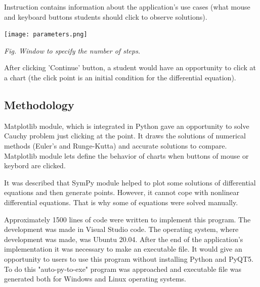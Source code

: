 \documentclass{article}
\begin{document}
\vspace{15mm}

Instruction contains information about the application's use cases (what mouse and keyboard buttons students should click to observe solutions).

\vspace{15mm}

\begin{center}
\texttt{[image: parameters.png]}
\end{center}

\centerline{\textit{Fig. Window to specify the number of steps.}} 

\vspace{15mm}

\par After clicking 'Continue' button, a student would have an opportunity to click at a chart (the click point is an initial condition for the differential equation).\\

\subsection{Methodology}
\par Matplotlib module, which is integrated in Python gave an opportunity to solve Cauchy problem just clicking at the point. It draws the solutions of numerical methods (Euler's and Runge-Kutta) and accurate solutions to compare. Matplotlib module lets define the behavior of charts when buttons of mouse or keybord are clicked.
\par It was described that SymPy module helped to plot some solutions of differential equations and then generate points. However, it cannot cope with nonlinear differential equations. That is why some of equations were solved manually.
\par Approximately 1500 lines of code were written to implement this program. The development was made in Visual Studio code. The operating system, where development was made, was Ubuntu 20.04. 
After the end of the application's implementation it was necessary to make an executable file. It would give an opportunity to users to use this program without installing Python and PyQT5. To do this "auto-py-to-exe" program was approached and executable file was generated both for Windows and Linux operating systems.
\end{document}
